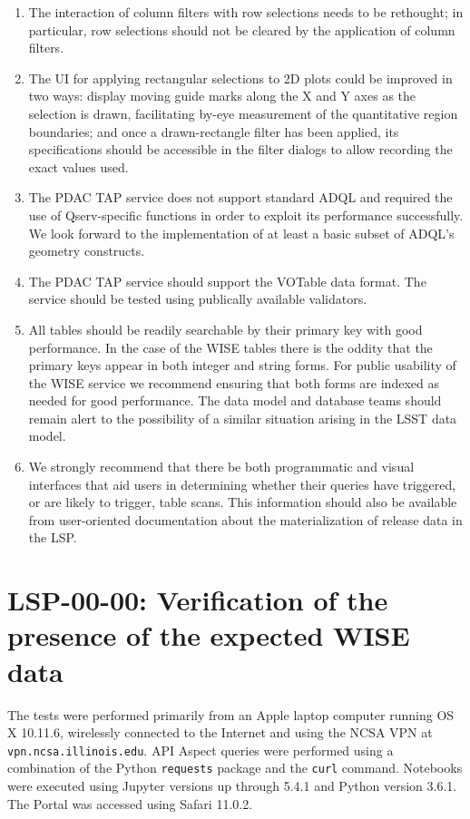 \documentclass[DM,lsstdraft,STR,toc]{lsstdoc}
\begin{document}
\begin{enumerate}
\item{The interaction of column filters with row selections needs to be rethought; in particular, row selections should not be cleared by the application of column filters.}
\item{The UI for applying rectangular selections to 2D plots could be improved in two ways:
display moving guide marks along the X and Y axes as the selection is drawn,
facilitating by-eye measurement of the quantitative region boundaries; and once a drawn-rectangle filter has been applied,
its specifications should be accessible in the filter dialogs to allow recording the exact values used.}
\item{The PDAC TAP service does not support standard ADQL and required the use of Qserv-specific functions in order to exploit its performance successfully.
We look forward to the implementation of at least a basic subset of ADQL's geometry constructs.}
\item{The PDAC TAP service should support the VOTable data format.
The service should be tested using publically available validators.}
\item{All tables should be readily searchable by their primary key with good performance.
In the case of the WISE tables there is the oddity that the primary keys appear in both integer and string forms.
For public usability of the WISE service we recommend ensuring that both forms are indexed as needed for good performance.
The data model and database teams should remain alert to the possibility of a similar situation arising in the LSST data model.}
\item{We strongly recommend that there be both programmatic and visual interfaces that aid users in determining whether their queries have triggered, or are likely to trigger, table scans.
This information should also be available from user-oriented documentation about the materialization of release data in the LSP.}

\end{enumerate}



\section{LSP-00-00: Verification of the presence of the expected WISE data}
\label{sect:detail-lsp-00-00}

The tests were performed primarily from an Apple laptop computer running OS X 10.11.6, wirelessly connected to the Internet and using the NCSA VPN at \texttt{vpn.ncsa.illinois.edu}.
API Aspect queries were performed using a combination of the Python \texttt{requests} package and the \texttt{curl} command.
Notebooks were executed using Jupyter versions up through 5.4.1 and Python version 3.6.1.
The Portal was accessed using Safari 11.0.2.
\end{document}
